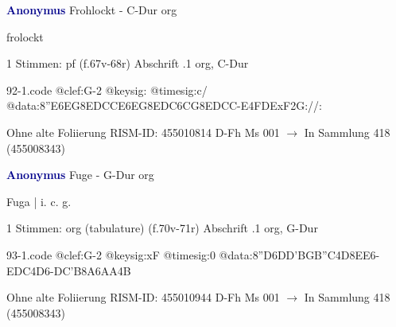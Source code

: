 \documentclass[twocolumn]{book}
\begin{document}
\newline \par \vspace{7pt} \textcolor{darkblue}{\textbf{Anonymus  }}
\newline Frohlockt - C-Dur
\newline org
\newline \begin{itshape}[f.67v, at left:] frolockt\end{itshape} 
\newline \textcolor{darkblue}{}  1 Stimmen: pf  (f.67v-68r)
\newline Abschrift
.1  org, C-Dur  
\begin{filecontents*}{92-1.code}
@clef:G-2
@keysig:
@timesig:c/
@data:{8''E6EG8ED}{CC}{E6EG8ED}{C6CG8ED}{CC}-E4FDExF2G://:
\end{filecontents*}
\newline
%
\newline Ohne alte Foliierung
\newline RISM-ID: 455010814
\newline D-Fh  Ms 001
\newline $\rightarrow$ In Sammlung 418 (455008343)
      
\newline \par \vspace{7pt} \textcolor{darkblue}{\textbf{Anonymus  }}
\newline Fuge - G-Dur
\newline org
\newline \begin{itshape}[f.70v, at left:] Fuga | i. c. g.\end{itshape} 
\newline \textcolor{darkblue}{}  1 Stimmen: org (tabulature)  (f.70v-71r)
\newline Abschrift
.1  org, G-Dur  
\begin{filecontents*}{93-1.code}
@clef:G-2
@keysig:xF
@timesig:0
@data:{8''D6DD}{'BGB''C}4D{8EE}6-{EDC}4D6-{DC'B}{8A6AA}4B
\end{filecontents*}
\newline
%
\newline Ohne alte Foliierung
\newline RISM-ID: 455010944
\newline D-Fh  Ms 001
\newline $\rightarrow$ In Sammlung 418 (455008343)
      
\end{document}
